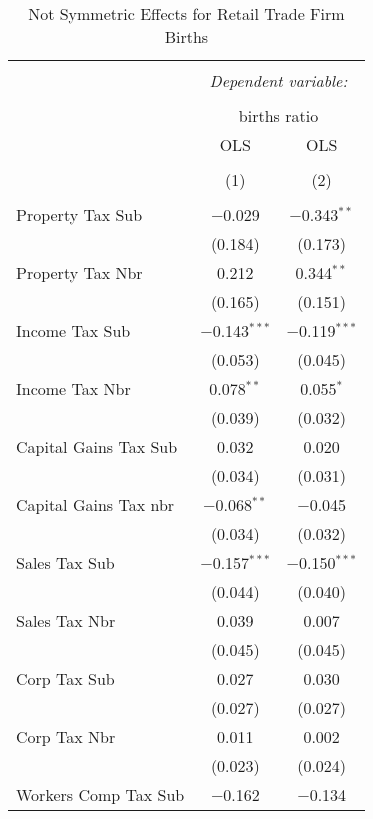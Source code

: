 
\begin{table}[!htbp] \centering 
  \caption{Not Symmetric Effects for  Retail Trade Firm Births} 
  \label{44-45noequality} 
\begin{tabular}{@{\extracolsep{5pt}}lcc} 
\\[-1.8ex]\hline 
\hline \\[-1.8ex] 
 & \multicolumn{2}{c}{\textit{Dependent variable:}} \\ 
\cline{2-3} 
\\[-1.8ex] & \multicolumn{2}{c}{births ratio} \\ 
 & OLS & OLS \\ 
\\[-1.8ex] & (1) & (2)\\ 
\hline \\[-1.8ex] 
 Property Tax Sub & $-$0.029 & $-$0.343$^{**}$ \\ 
  & (0.184) & (0.173) \\ 
  Property Tax Nbr & 0.212 & 0.344$^{**}$ \\ 
  & (0.165) & (0.151) \\ 
  Income Tax Sub & $-$0.143$^{***}$ & $-$0.119$^{***}$ \\ 
  & (0.053) & (0.045) \\ 
  Income Tax Nbr & 0.078$^{**}$ & 0.055$^{*}$ \\ 
  & (0.039) & (0.032) \\ 
  Capital Gains Tax Sub & 0.032 & 0.020 \\ 
  & (0.034) & (0.031) \\ 
  Capital Gains Tax nbr & $-$0.068$^{**}$ & $-$0.045 \\ 
  & (0.034) & (0.032) \\ 
  Sales Tax Sub & $-$0.157$^{***}$ & $-$0.150$^{***}$ \\ 
  & (0.044) & (0.040) \\ 
  Sales Tax Nbr & 0.039 & 0.007 \\ 
  & (0.045) & (0.045) \\ 
  Corp Tax Sub & 0.027 & 0.030 \\ 
  & (0.027) & (0.027) \\ 
  Corp Tax Nbr & 0.011 & 0.002 \\ 
  & (0.023) & (0.024) \\ 
  Workers Comp Tax Sub & $-$0.162 & $-$0.134 \\ 

\end{tabular}
\end{table}
